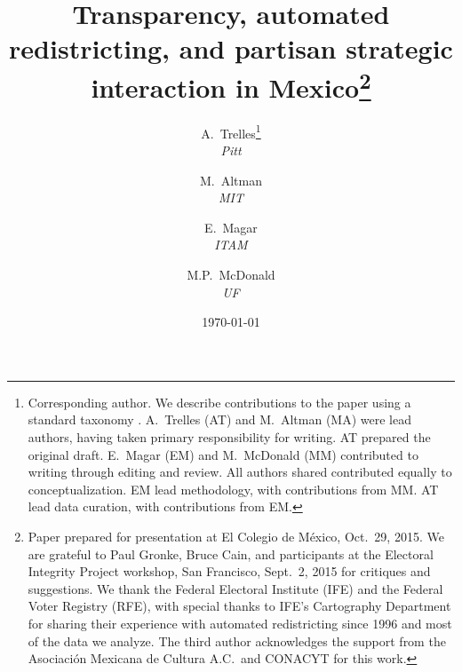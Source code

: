 \documentclass[letter,12pt]{article}
\begin{document}
\title{Transparency, automated redistricting, and partisan strategic interaction in Mexico\thanks{Paper prepared for presentation at El Colegio de M\'exico, Oct.~29, 2015. We are grateful to Paul Gronke, Bruce Cain, and participants at the Electoral Integrity Project workshop, San Francisco, Sept.~2, 2015 for critiques and suggestions. We thank the Federal Electoral Institute (IFE) and the Federal Voter Registry (RFE), with special thanks to IFE's Cartography Department for sharing their experience with automated redistricting since 1996 and most of the data we analyze. The third author acknowledges the support from the Asociaci\'on Mexicana de Cultura A.C.\ and CONACYT for this work.}}

\author {A.~Trelles\footnote{Corresponding author. We describe contributions to the paper using a standard taxonomy \citep{allen2014credit}. A.~Trelles (AT) and M.~Altman (MA) were lead authors, having taken primary responsibility for writing.  AT prepared the original draft.  E.~Magar (EM) and M.~McDonald (MM) contributed to writing through editing and review. All authors shared contributed equally to conceptualization. EM lead methodology, with contributions from MM. AT lead data curation, with contributions from EM.} \\ \emph{Pitt} \and
        M.~Altman  \\ \emph{MIT} \and
        E.~Magar  \\  \emph{ITAM} \and
        M.P.~McDonald \\ \emph{UF}
      }
      


\date{\today}
\maketitle
\end{document}

